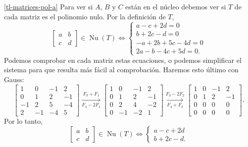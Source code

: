 \begin{enumerate}[topsep=6pt, itemsep=.4cm]
    \ref{tl-matrices-pol-a}  Para ver si $A$, $B$ y $C$ están en el núcleo debemos ver si $T$ de cada matriz es el polinomio nulo. Por la definición de $T$,
    $$
    \begin{bmatrix}  a&b\\c&d \end{bmatrix} \in \operatorname{Nu}(T) \Leftrightarrow \begin{cases}
        a-c+2d=0\\
        b+2c-d=0\\
        -a+2b+5c-4d=0\\
        2a-b-4c+5d=0.
    \end{cases}
    $$
    Podemos comprobar en cada matriz estas ecuaciones, o podemos simplificar el sistema para que resulta más fácil al comprobación. Haremos esto último con Gauss:
    \begin{equation*}
        \begin{bmatrix}
            1 & 0 & -1 & 2 \\
            0 & 1 & 2 & -1 \\
            -1 & 2 & 5 & -4 \\
            2 & -1 & -4 & 5
        \end{bmatrix}
        \underset{F_4-2F_1}{\stackrel{F_3+F_1}{\longrightarrow}}
        \begin{bmatrix}
            1 & 0 & -1 & 2 \\
            0 & 1 & 2 & -1 \\
            0 & 2 & 4 & -2 \\
            0 & -1 & -2 & 1
        \end{bmatrix}
        \underset{F_4+F_2}{\stackrel{F_3-2F_2}{\longrightarrow}}
        \begin{bmatrix}
            1 & 0 & -1 & 2 \\
            0 & 1 & 2 & -1 \\
            0 & 0 & 0 & 0 \\
            0 & 0 & 0 & 0
        \end{bmatrix}.
    \end{equation*}
    Por lo tanto, 
    $$
    \begin{bmatrix}  a&b\\c&d \end{bmatrix} \in \operatorname{Nu}(T) \Leftrightarrow \begin{cases}
        a-c+2d\\
        b+2c-d.
    \end{cases}
$$
\end{enumerate}

